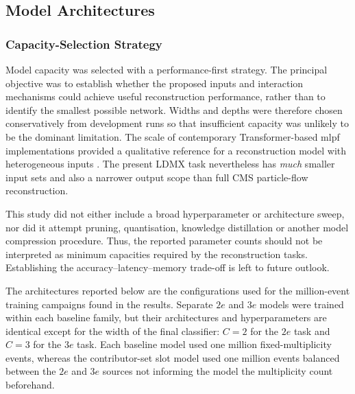 

















\subsection{Model Architectures}
\label{sec:method_models}


\subsubsection{Capacity-Selection Strategy}
\label{sec:method_capacity_selection}

Model capacity was selected with a performance-first strategy. The principal
objective was to establish whether the proposed inputs and interaction
mechanisms could achieve useful reconstruction performance, rather than to
identify the smallest possible network. Widths and depths were therefore
chosen conservatively from development runs so that insufficient capacity was
unlikely to be the dominant limitation. The scale of contemporary
Transformer-based \gls{mlpf} implementations provided a qualitative reference
for a reconstruction model with heterogeneous inputs
\cite{pata2026-mlpf}. The present LDMX task nevertheless has \emph{much} smaller input
sets and also a narrower output scope than full CMS particle-flow reconstruction.

This study did not either include a broad hyperparameter or architecture sweep, nor
did it attempt pruning, quantisation, knowledge distillation or another model
compression procedure. Thus, the reported parameter counts should not be interpreted as
minimum capacities required by the reconstruction tasks. Establishing the
accuracy--latency--memory trade-off is left to future outlook.

The architectures reported below are the configurations used for the
million-event training campaigns found in the results. Separate \(2e\) and \(3e\) models were
trained within each baseline family, but their architectures and
hyperparameters are identical except for the width of the final classifier:
\(C=2\) for the \(2e\) task and \(C=3\) for the \(3e\) task. Each baseline model used one million
fixed-multiplicity events, whereas the contributor-set slot model used one
million events balanced between the \(2e\) and \(3e\) sources not informing the model the multiplicity count beforehand.




